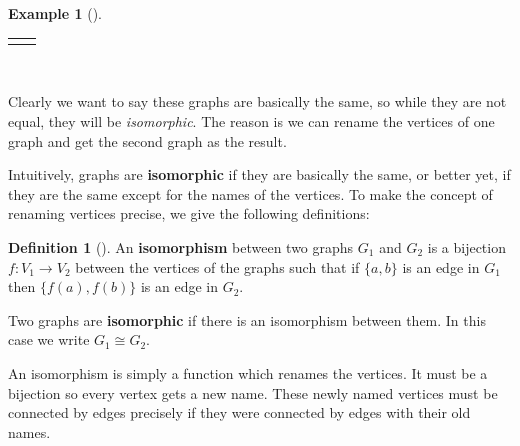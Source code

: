 \documentclass[10pt,]{book}
\newcommand{\terminology}[1]{\textbf{#1}}
\theoremstyle{plain}
\theoremstyle{definition}
\newtheorem{definition}[theorem]{Definition}
\theoremstyle{definition}
\newtheorem{example}[theorem]{Example}
\theoremstyle{definition}
\numberwithin{equation}{chapter}
\newlength{\panelmax}
\def\isom{\cong}
\begin{document}
\begin{example}[]
{\setlength{\panelmax}{\maxof{\panelmax}{\phBimage}}
\leavevmode%
\setlength{\tabcolsep}{0.125\linewidth}
\par\medskip\noindent
\hspace*{0.125\linewidth}%
\begin{tabular}{@{}*{2}{c}@{}}
\begin{minipage}[c][\panelmax][b]{0.25\linewidth}\usebox{\panelboxAimage}\end{minipage}&
\begin{minipage}[c][\panelmax][b]{0.25\linewidth}\usebox{\panelboxBimage}\end{minipage}\end{tabular}\\
}%
\par
\hypertarget{p-50}{}%
Clearly we want to say these graphs are basically the same, so while they are not equal, they will be \emph{isomorphic}. The reason is we can rename the vertices of one graph and get the second graph as the result.%
\end{example}
\hypertarget{p-51}{}%
Intuitively, graphs are \terminology{isomorphic}  if they are basically the same, or better yet, if they are the same except for the names of the vertices. To make the concept of renaming vertices precise, we give the following definitions:%
\begin{definition}[{}]\label{definition-2}
\hypertarget{p-52}{}%
 An \terminology{isomorphism} between two graphs \(G_1\) and \(G_2\) is a bijection \(f:V_1 \to V_2\) between the vertices of the graphs such that if \(\{a,b\}\) is an edge in \(G_1\) then \(\{f(a), f(b)\}\) is an edge in \(G_2\).%
\par
\hypertarget{p-53}{}%
Two graphs are \terminology{isomorphic} if there is an isomorphism between them. In this case we write \(G_1 \isom G_2\).%
\end{definition}
\hypertarget{p-54}{}%
An isomorphism is simply a function which renames the vertices. It must be a bijection so every vertex gets a new name. These newly named vertices must be connected by edges precisely if they were connected by edges with their old names.%
\end{document}
